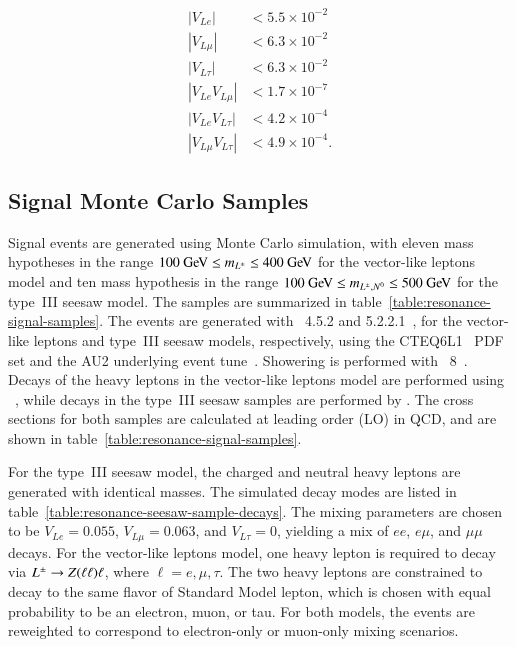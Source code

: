 \begin{align}
|V_{L e}| & <5.5\times10^{-2}\\
|V_{L \mu}| & <6.3\times10^{-2}\\
|V_{L \tau}| & <6.3\times10^{-2}\\
|V_{L e}V_{L\mu}| & <1.7\times10^{-7}\\
|V_{L e}V_{L\tau}| & <4.2\times10^{-4}\\
|V_{L \mu}V_{L\tau}| & <4.9\times10^{-4}.
\end{align}

\subsection{Signal Monte Carlo Samples}\label{sec:resonance-signal-mc-samples}

Signal events are generated using Monte Carlo simulation, with eleven mass hypotheses in the range $100 \GeV \leq m_{\lpm} \leq 400 \GeV$ for the vector-like leptons model and ten mass hypothesis in the range $100 \GeV \leq m_{\lpm,\lzero}\leq 500 \GeV$ for the type~III seesaw model. The samples are summarized in table~\ref{table:resonance-signal-samples}. The events are generated with \madgraph~4.5.2 and 5.2.2.1~\cite{madgraph}, for the vector-like leptons and type~III seesaw models, respectively, using the CTEQ6L1~\cite{ct6l1} PDF set and the AU2 underlying event tune~\cite{AU2}. Showering is performed with \pythia~8~\cite{Sjostrand:2008bk}. Decays of the heavy leptons in the vector-like leptons model are performed using \bridge~\cite{bridge}, while decays in the type~III seesaw samples are performed by \madgraph. The cross sections for both samples are calculated at leading order (LO) in QCD, and are shown in table~\ref{table:resonance-signal-samples}. 

For the type~III seesaw model, the charged and neutral heavy leptons are generated with identical masses. The simulated decay modes are listed in table~\ref{table:resonance-seesaw-sample-decays}. The mixing parameters are chosen to be $V_{L e}=0.055$, $V_{L\mu}=0.063$, and $V_{L\tau}=0$, yielding a mix of $ee$, $e\mu$, and $\mu\mu$ decays. For the vector-like leptons model, one heavy lepton is required to decay via $L^{\pm}\rightarrow Z(\ell\ell)\ell$, where $\ell=e,\mu,\tau$. The two heavy leptons are constrained to decay to the same flavor of Standard Model lepton, which is chosen with equal probability to be an electron, muon, or tau. For both models, the events are reweighted to correspond to electron-only or muon-only mixing scenarios. 

